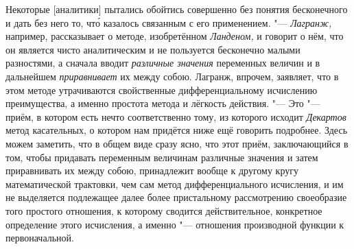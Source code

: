 Некоторые [аналитики] пытались обойтись совершенно без понятия бесконечного и
дать без него то, чт\'{о} казалось связанным с его применением. "---
{\em Лагранж,} например, рассказывает о методе, изобретённом {\em Ланденом,} и
говорит о нём, что он является чисто аналитическим и не пользуется бесконечно
малыми разностями, а сначала вводит {\em различные значения} переменных величин и
в дальнейшем {\em приравнивает} их между собою. Лагранж, впрочем, заявляет, что
в этом методе утрачиваются свойственные дифференциальному исчислению
преимущества, а именно простота метода и лёгкость действия. "--- Это "---
приём, в котором есть нечто соответственно тому, из которого исходит
{\em Декартов} метод касательных, о котором нам придётся ниже ещё говорить
подробнее. Здесь можем заметить, что в общем виде сразу ясно, что этот приём,
заключающийся в том, чтобы придавать переменным величинам различные значения и
затем приравнивать их между собою, принадлежит вообще к другому кругу
математической трактовки, чем сам метод дифференциального исчисления, и им не
выделяется подлежащее далее более пристальному рассмотрению своеобразие того
простого отношения, к которому сводится действительное, конкретное определение
этого исчисления, а именно "--- отношения производной функции к первоначальной.

